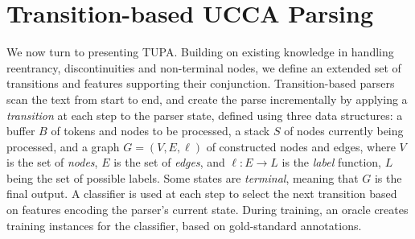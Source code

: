 \documentclass[11pt,a4paper]{article}
\newcommand{\parser}[1]{TUPA\textsubscript{#1}}
\begin{document}
\section{Transition-based UCCA Parsing}\label{sec:parser}

We now turn to presenting \parser{}.
Building on existing knowledge in handling reentrancy, discontinuities and non-terminal nodes,
we define an extended set of transitions and features supporting their conjunction.
Transition-based parsers \cite{Nivre03anefficient} scan the text from start to end,
and create the parse incrementally by applying a \textit{transition}
at each step to the parser state,
defined using three data structures: a buffer $B$ of tokens and nodes to be processed,
a stack $S$ of nodes currently being processed,
and a graph $G=(V,E,\ell)$ of constructed nodes and edges,
where $V$ is the set of \emph{nodes}, $E$ is the set of \emph{edges},
and $\ell : E \to L$ is the \emph{label} function, $L$ being the set of possible labels.
Some states are \textit{terminal}, meaning that $G$ is the final output.
A classifier is used at each step to select the next transition based on features
encoding the parser's current state.
During training, an oracle creates training instances for the classifier,
based on gold-standard annotations.
\end{document}
